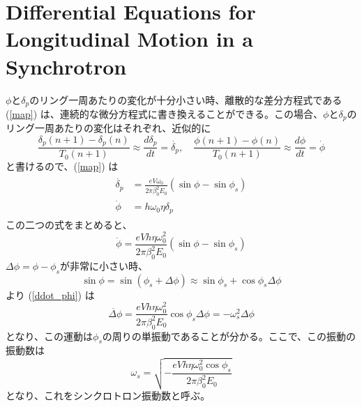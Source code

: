 \documentclass[10pt,a4paper]{ltjsarticle}
\begin{document}
\section{Differential Equations for Longitudinal Motion in a Synchrotron}
$\phi$と$\delta_p$のリング一周あたりの変化が十分小さい時、離散的な差分方程式である (\ref{map}) は、連続的な微分方程式に書き換えることができる。この場合、$\phi$と$\delta_p$のリング一周あたりの変化はそれぞれ、近似的に
%
\begin{equation}
    \frac{\delta_p(n+1)-\delta_p(n)}{T_0(n+1)} \approx \frac{d\delta_p}{dt}=\dot{\delta_p},\quad 
    \frac{\phi(n+1)-\phi(n)}{T_0(n+1)} \approx \frac{d\phi}{dt}= \dot{\phi}
\end{equation}
%
と書けるので、(\ref{map}) は
%
\begin{align}
    \begin{split}
        \dot{\delta_p} &= \frac{e V \omega_0}{2\pi \beta_0^2 E_0}(\sin\phi - \sin\phi_s) \\
        \dot{\phi} &= h \omega_0 \eta \delta_p
    \end{split}
\end{align}
%
この二つの式をまとめると、
%
\begin{equation}
  \ddot{\phi} = \frac{e V h \eta \omega_0^2}{2\pi\beta_0^2 E_0}(\sin\phi-\sin\phi_s)
  \label{ddot_phi}
\end{equation}
%
$\Delta\phi = \phi - \phi_s$が非常に小さい時、
%
\begin{equation}
    \sin\phi = \sin(\phi_s+\Delta\phi) \approx \sin\phi_s + \cos\phi_s \Delta\phi
\end{equation}
%
より (\ref{ddot_phi}) は
%
\begin{equation}
    \ddot{\Delta\phi} = \frac{e V h \eta \omega_0^2}{2\pi \beta_0^2 E_0} \cos\phi_s \Delta\phi = - \omega_s^2 \Delta\phi
\end{equation}
%
となり、この運動は$\phi_s$の周りの単振動であることが分かる。ここで、この振動の振動数は
%
\begin{equation}
    \omega_s = \sqrt{-\frac{e V h \eta \omega_0^2 \cos\phi_s}{2\pi \beta_0^2 E_0}}
\end{equation}
%
となり、これをシンクロトロン振動数と呼ぶ。
%
\clearpage

\appendix
\renewcommand{\theequation}{\Alph{section}.\arabic{equation} }
\setcounter{equation}{0}
\end{document}
